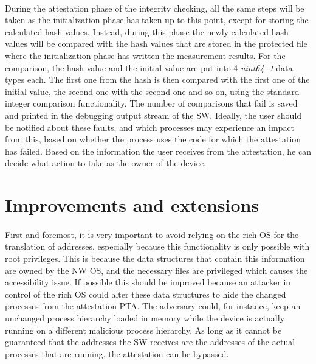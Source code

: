 \paragraph*{}
During the attestation phase of the integrity checking, all the same steps will be taken as the initialization phase has taken up to this point, except for storing the calculated hash values. Instead, during this phase the newly calculated hash values will be compared with the hash values that are stored in the protected file where the initialization phase has written the measurement results. For the comparison, the hash value and the initial value are put into 4 \textit{uint64\_t} data types each. The first one from the hash is then compared with the first one of the initial value, the second one with the second one and so on, using the standard integer comparison functionality. The number of comparisons that fail is saved and printed in the debugging output stream of the SW. Ideally, the user should be notified about these faults, and which processes may experience an impact from this, based on whether the process uses the code for which the attestation has failed. Based on the information the user receives from the attestation, he can decide what action to take as the owner of the device.

\section{Improvements and extensions}

\paragraph*{}
First and foremost, it is very important to avoid relying on the rich OS for the translation of addresses, especially because this functionality is only possible with root privileges. This is because the data structures that contain this information are owned by the NW OS, and the necessary files are privileged which causes the accessibility issue. If possible this should be improved because an attacker in control of the rich OS could alter these data structures to hide the changed processes from the attestation PTA. The adversary could, for instance, keep an unchanged process hierarchy loaded in memory while the device is actually running on a different malicious process hierarchy. As long as it cannot be guaranteed that the addresses the SW receives are the addresses of the actual processes that are running, the attestation can be bypassed. 

